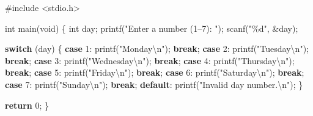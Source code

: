 \documentclass[
  letterpaper,
  DIV=11,
  numbers=noendperiod]{scrreprt}
\newenvironment{Shaded}{\begin{snugshade}}{\end{snugshade}}
\newcommand{\ControlFlowTok}[1]{\textcolor[rgb]{0.00,0.23,0.31}{\textbf{#1}}}
\newcommand{\DataTypeTok}[1]{\textcolor[rgb]{0.68,0.00,0.00}{#1}}
\newcommand{\DecValTok}[1]{\textcolor[rgb]{0.68,0.00,0.00}{#1}}
\newcommand{\ImportTok}[1]{\textcolor[rgb]{0.00,0.46,0.62}{#1}}
\newcommand{\NormalTok}[1]{\textcolor[rgb]{0.00,0.23,0.31}{#1}}
\newcommand{\OperatorTok}[1]{\textcolor[rgb]{0.37,0.37,0.37}{#1}}
\newcommand{\PreprocessorTok}[1]{\textcolor[rgb]{0.68,0.00,0.00}{#1}}
\newcommand{\SpecialCharTok}[1]{\textcolor[rgb]{0.37,0.37,0.37}{#1}}
\newcommand{\StringTok}[1]{\textcolor[rgb]{0.13,0.47,0.30}{#1}}
\begin{document}
\begin{Shaded}
\begin{Highlighting}[]
\PreprocessorTok{\#include }\ImportTok{\textless{}stdio.h\textgreater{}}

\DataTypeTok{int}\NormalTok{ main}\OperatorTok{(}\DataTypeTok{void}\OperatorTok{)} \OperatorTok{\{}
    \DataTypeTok{int}\NormalTok{ day}\OperatorTok{;}
\NormalTok{    printf}\OperatorTok{(}\StringTok{"Enter a number (1–7): "}\OperatorTok{);}
\NormalTok{    scanf}\OperatorTok{(}\StringTok{"}\SpecialCharTok{\%d}\StringTok{"}\OperatorTok{,} \OperatorTok{\&}\NormalTok{day}\OperatorTok{);}

    \ControlFlowTok{switch} \OperatorTok{(}\NormalTok{day}\OperatorTok{)} \OperatorTok{\{}
        \ControlFlowTok{case} \DecValTok{1}\OperatorTok{:}\NormalTok{ printf}\OperatorTok{(}\StringTok{"Monday}\SpecialCharTok{\textbackslash{}n}\StringTok{"}\OperatorTok{);} \ControlFlowTok{break}\OperatorTok{;}
        \ControlFlowTok{case} \DecValTok{2}\OperatorTok{:}\NormalTok{ printf}\OperatorTok{(}\StringTok{"Tuesday}\SpecialCharTok{\textbackslash{}n}\StringTok{"}\OperatorTok{);} \ControlFlowTok{break}\OperatorTok{;}
        \ControlFlowTok{case} \DecValTok{3}\OperatorTok{:}\NormalTok{ printf}\OperatorTok{(}\StringTok{"Wednesday}\SpecialCharTok{\textbackslash{}n}\StringTok{"}\OperatorTok{);} \ControlFlowTok{break}\OperatorTok{;}
        \ControlFlowTok{case} \DecValTok{4}\OperatorTok{:}\NormalTok{ printf}\OperatorTok{(}\StringTok{"Thursday}\SpecialCharTok{\textbackslash{}n}\StringTok{"}\OperatorTok{);} \ControlFlowTok{break}\OperatorTok{;}
        \ControlFlowTok{case} \DecValTok{5}\OperatorTok{:}\NormalTok{ printf}\OperatorTok{(}\StringTok{"Friday}\SpecialCharTok{\textbackslash{}n}\StringTok{"}\OperatorTok{);} \ControlFlowTok{break}\OperatorTok{;}
        \ControlFlowTok{case} \DecValTok{6}\OperatorTok{:}\NormalTok{ printf}\OperatorTok{(}\StringTok{"Saturday}\SpecialCharTok{\textbackslash{}n}\StringTok{"}\OperatorTok{);} \ControlFlowTok{break}\OperatorTok{;}
        \ControlFlowTok{case} \DecValTok{7}\OperatorTok{:}\NormalTok{ printf}\OperatorTok{(}\StringTok{"Sunday}\SpecialCharTok{\textbackslash{}n}\StringTok{"}\OperatorTok{);} \ControlFlowTok{break}\OperatorTok{;}
        \ControlFlowTok{default}\OperatorTok{:}\NormalTok{ printf}\OperatorTok{(}\StringTok{"Invalid day number.}\SpecialCharTok{\textbackslash{}n}\StringTok{"}\OperatorTok{);}
    \OperatorTok{\}}

    \ControlFlowTok{return} \DecValTok{0}\OperatorTok{;}
\OperatorTok{\}}
\end{Highlighting}
\end{Shaded}
\end{document}

